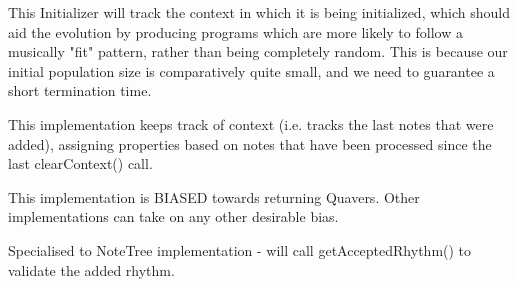 \documentclass[11pt]{report}
\begin{document}
{{{{ This Initializer will track the context in which it is being 
 initialized, which should aid the evolution by producing
 programs which are more likely to follow a musically "fit"
 pattern, rather than being completely random. This is because our
 initial population size is comparatively quite small, and we 
 need to guarantee a short termination time.
 
 This implementation keeps track of context (i.e. tracks the
 last notes that were added), assigning properties based
 on notes that have been processed since the last clearContext()
 call.
 
 This implementation is BIASED towards returning Quavers.
 Other implementations can take on any other desirable bias.
 
 Specialised to NoteTree implementation - will call 
 getAcceptedRhythm() to validate the added rhythm.
 
}}}}
\end{document}
